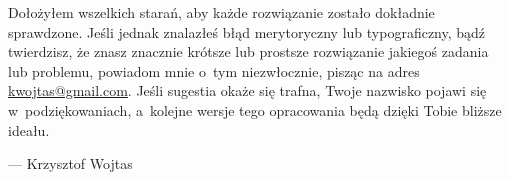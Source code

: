 Dołożyłem wszelkich starań, aby każde rozwiązanie zostało dokładnie sprawdzone.
Jeśli jednak znalazłeś błąd merytoryczny lub typograficzny, bądź twierdzisz, że znasz znacznie krótsze lub prostsze rozwiązanie jakiegoś zadania lub problemu, powiadom mnie o~tym niezwłocznie, pisząc na adres \url{kwojtas@gmail.com}.
Jeśli sugestia okaże się trafna, Twoje nazwisko pojawi się w~podziękowaniach, a~kolejne wersje tego opracowania będą dzięki Tobie bliższe ideału.

\bigskip
\bigskip
{}\hfill--- Krzysztof Wojtas
